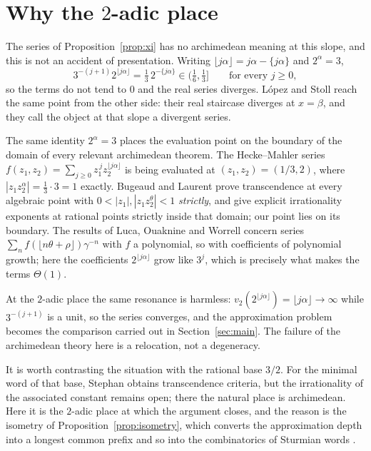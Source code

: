 \documentclass[11pt,reqno]{amsart}
\theoremstyle{plain}
\theoremstyle{definition}
\newcommand{\vt}{v_2}
\begin{document}
\section{Why the $2$-adic place}\label{sec:place}

The series of Proposition~\ref{prop:xi} has no archimedean meaning at this slope,
and this is not an accident of presentation. Writing $\lfloor
j\alpha\rfloor=j\alpha-\{j\alpha\}$ and $2^{\alpha}=3$,
\[
3^{-(j+1)}2^{\lfloor j\alpha\rfloor}=\tfrac13\,2^{-\{j\alpha\}}\in\bigl(\tfrac16,\tfrac13\bigr]
\qquad\text{for every }j\ge0,
\]
so the terms do not tend to $0$ and the real series diverges. L\'opez and Stoll
reach the same point from the other side: their real staircase diverges at
$x=\beta$, and they call the object at that slope a divergent series.

The same identity $2^{\alpha}=3$ places the evaluation point on the boundary of
the domain of every relevant archimedean theorem. The Hecke--Mahler series
$f(z_1,z_2)=\sum_{j\ge0}z_1^{\,j}z_2^{\lfloor j\alpha\rfloor}$ is being evaluated
at $(z_1,z_2)=(1/3,2)$, where $|z_1z_2^{\alpha}|=\tfrac13\cdot 3=1$ exactly.
Bugeaud and Laurent \cite{BugeaudLaurent2023} prove transcendence at every
algebraic point with $0<|z_1|,|z_1z_2^{\theta}|<1$ \emph{strictly}, and give
explicit irrationality exponents at rational points strictly inside that domain;
our point lies on its boundary. The results of Luca, Ouaknine and Worrell
\cite{LucaOuaknineWorrell2022,LucaOuaknineWorrell2025} concern series
$\sum_n f(\lfloor n\theta+\rho\rfloor)\gamma^{-n}$ with $f$ a polynomial, so with
coefficients of polynomial growth; here the coefficients $2^{\lfloor
j\alpha\rfloor}$ grow like $3^{j}$, which is precisely what makes the terms
$\Theta(1)$.

At the $2$-adic place the same resonance is harmless: $\vt(2^{\lfloor
j\alpha\rfloor})=\lfloor j\alpha\rfloor\to\infty$ while $3^{-(j+1)}$ is a unit, so
the series converges, and the approximation problem becomes the comparison
carried out in Section~\ref{sec:main}. The failure of the archimedean theory here
is a relocation, not a degeneracy.

It is worth contrasting the situation with the rational base $3/2$. For the
minimal word of that base, Stephan \cite{Stephan2026} obtains transcendence
criteria, but the irrationality of the associated constant remains open; there
the natural place is archimedean. Here it is the $2$-adic place at which the
argument closes, and the reason is the isometry of
Proposition~\ref{prop:isometry}, which converts the approximation depth into a
longest common prefix and so into the combinatorics of Sturmian words
\cite{Lothaire2002}.
\end{document}
